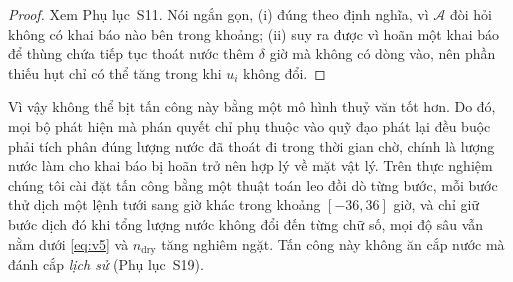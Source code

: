 \begin{proof}
Xem Phụ lục~S11. Nói ngắn gọn, (i) đúng theo định nghĩa, vì $\mathcal{A}$ đòi
hỏi không có khai báo nào bên trong khoảng; (ii) suy ra được vì hoãn một khai
báo để thùng chứa tiếp tục thoát nước thêm $\delta$ giờ mà không có dòng vào,
nên phần thiếu hụt chỉ có thể tăng trong khi $u_i$ không đổi.
\end{proof}

Vì vậy không thể bịt tấn công này bằng một mô hình thuỷ văn tốt hơn. Do đó, mọi bộ phát hiện mà phán quyết chỉ phụ thuộc vào quỹ đạo phát lại đều buộc
phải tích phân đúng lượng nước đã thoát đi trong thời gian chờ, chính là lượng
nước làm cho khai báo bị hoãn trở nên hợp lý về mặt vật lý. Trên
thực nghiệm chúng tôi cài đặt tấn công bằng một thuật toán leo đồi dò từng bước, mỗi bước thử dịch một lệnh tưới sang giờ khác trong khoảng
$[-36,36]$ giờ, và chỉ giữ bước dịch đó khi tổng lượng nước không đổi đến từng
chữ số, mọi độ sâu vẫn nằm dưới \eqref{eq:v5} và $n_{\mathrm{dry}}$ tăng nghiêm
ngặt. Tấn công này không ăn cắp nước mà đánh cắp \emph{lịch sử} (Phụ lục~S19).
